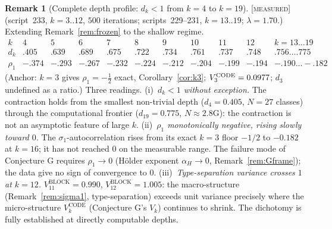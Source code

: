 \documentclass[11pt]{article}
\theoremstyle{definition}
\newtheorem{remark}[theorem]{Remark}
\newcommand{\MEASURED}{\textup{[\textsc{measured}]}}
\newcommand{\lam}{\lambda}
\begin{document}
\begin{remark}[Complete depth profile: $d_k < 1$ from $k=4$ to $k=19$]\label{rem:full_dk}
\MEASURED{} (script~233, $k{=}3..12$, $500$ iterations; scripts~229--231, $k{=}13..19$;
$\lam{=}1.70$.) Extending Remark~\ref{rem:frozen} to the shallow regime.
\[
\begin{array}{r|rrrrrrrrr|l}
k & 4 & 5 & 6 & 7 & 8 & 9 & 10 & 11 & 12 & k{=}13\ldots19\\
\hline
d_k     & .405 & .639 & .689 & .675 & .722 & .734 & .761 & .737 & .748
        & .756\ldots.775 \\
\rho_1  & -.374 & -.293 & -.267 & -.232 & -.224 & -.212 & -.204 & -.199 & -.194
        & -.190\ldots-.182
\end{array}
\]
(Anchor: $k=3$ gives $\rho_1 = -\tfrac{1}{2}$ exact, Corollary~\ref{cor:k3};
$V_3^{\rm CODE} = 0.0977$; $d_3$ undefined as a ratio.)
Three readings.
(i)~\emph{$d_k < 1$ without exception.} The contraction holds from the smallest
non-trivial depth ($d_4 = 0.405$, $N = 27$ classes) through the computational
frontier ($d_{19} = 0.775$, $N \approx 2.8\text{G}$): the contraction is not
an asymptotic feature of large $k$.
(ii)~\emph{$\rho_1$ monotonically negative, rising slowly toward $0$.} The
$\sigma_1$-autocorrelation rises from its exact $k=3$ floor $-1/2$
to $-0.182$ at $k=16$; it has not reached $0$ on the measurable range.
The failure mode of Conjecture G requires $\rho_1 \to 0$
(H\"older exponent $\alpha_H \to 0$, Remark~\ref{rem:Gframe}); the data give
no sign of convergence to $0$.
(iii)~\emph{Type-separation variance crosses $1$ at $k=12$.}
$V_{11}^{\mathrm{BLOCK}} = 0.990$, $V_{12}^{\mathrm{BLOCK}} = 1.005$:
the macro-structure (Remark~\ref{rem:sigma1}, type-separation) exceeds unit
variance precisely where the micro-structure $V_k^{\mathrm{CODE}}$ (Conjecture G's
$V_k$) continues to shrink. The dichotomy is fully established at
directly computable depths.
\end{remark}
\end{document}
